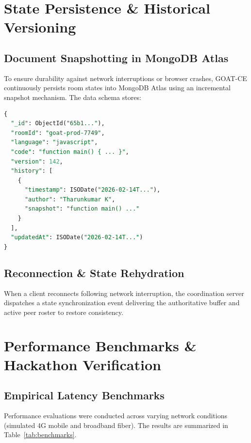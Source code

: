 \documentclass[12pt,a4paper]{report}
\begin{document}
\chapter{State Persistence \& Historical Versioning}

\section{Document Snapshotting in MongoDB Atlas}
To ensure durability against network interruptions or browser crashes, GOAT-CE continuously persists room states into MongoDB Atlas using an incremental snapshot mechanism. The data schema stores:
\begin{lstlisting}[language=SQL,caption={MongoDB Document Session Schema}]
{
  "_id": ObjectId("65b1..."),
  "roomId": "goat-prod-7749",
  "language": "javascript",
  "code": "function main() { ... }",
  "version": 142,
  "history": [
    {
      "timestamp": ISODate("2026-02-14T..."),
      "author": "Tharunkumar K",
      "snapshot": "function main() ..."
    }
  ],
  "updatedAt": ISODate("2026-02-14T...")
}
\end{lstlisting}

\section{Reconnection \& State Rehydration}
When a client reconnects following network interruption, the coordination server dispatches a state synchronization event delivering the authoritative buffer and active peer roster to restore consistency.

\chapter{Performance Benchmarks \& Hackathon Verification}

\section{Empirical Latency Benchmarks}
Performance evaluations were conducted across varying network conditions (simulated 4G mobile and broadband fiber). The results are summarized in Table~\ref{tab:benchmarks}.
\end{document}
